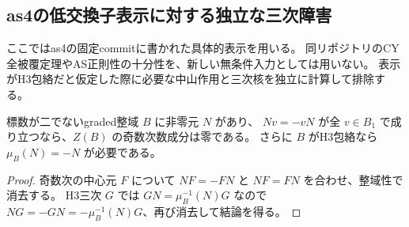 \subsection{as4の低交換子表示に対する独立な三次障害}
\label{subsec:as4-low-commutator-direct}
ここではas4の固定commit\cite{AS4lowpinned}に書かれた具体的表示を用いる。
同リポジトリのCY全被覆定理やAS正則性の十分性を、新しい無条件入力としては用いない。
表示がH3包絡だと仮定した際に必要な中山作用と三次核を独立に計算して排除する。

\begin{lemma}[符号反転を実現する正規元]
\label{lem:normal-parity-odd-centre}
標数が二でないgraded整域 $B$ に非零元 $N$ があり、
$Nv=-vN$ が全 $v\in B_1$ で成り立つなら、$Z(B)$ の奇数次数成分は零である。
さらに $B$ がH3包絡なら $\mu_B(N)=-N$ が必要である。
\end{lemma}
\begin{proof}
奇数次の中心元 $F$ について $NF=-FN$ と $NF=FN$ を合わせ、整域性で消去する。
H3三次 $G$ では $GN=\mu_B^{-1}(N)G$ なので
$NG=-GN=-\mu_B^{-1}(N)G$、再び消去して結論を得る。
\end{proof}

